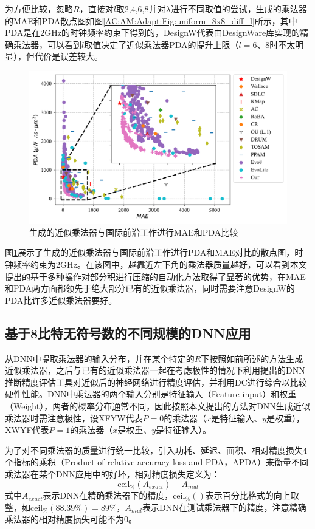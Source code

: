 为方便比较，忽略$R$，直接对$l$取2,4,6,8并对$\lambda$进行不同取值的尝试，生成的乘法器的MAE和PDA散点图如图\ref{AC:AM:Adapt:Fig:uniform_8x8_diff_l}所示，其中PDA是在2GHz的时钟频率约束下得到的，DesignW代表由DesignWare库\cite{IP:DesignWare}实现的精确乘法器，可以看到$l$取值决定了近似乘法器PDA的提升上限（$l=6$、8时不太明显），但代价是误差较大。

\begin{figure}[!h]
    \centering
    \includegraphics[width=\linewidth]{figs/AC-AM-Adapt-uniform_8x8_PDA_MAE.pdf}
    \caption{生成的近似乘法器与国际前沿工作进行MAE和PDA比较}
    \label{AC:AM:Adapt:Fig:uniform_8x8_PDA_MAE}
\end{figure}
图\ref{AC:AM:Adapt:Fig:uniform_8x8_PDA_MAE}展示了生成的近似乘法器与国际前沿工作进行PDA和MAE对比的散点图，时钟频率约束为2GHz。在该图中，越靠近左下角的乘法器质量越好，可以看到本文提出的基于多种操作对部分积进行压缩的自动化方法取得了显著的优势，在MAE和PDA两方面都领先于绝大部分已有的近似乘法器，同时需要注意DesignW的PDA比许多近似乘法器要好。


\subsection{基于8比特无符号数的不同规模的DNN应用}

从DNN中提取乘法器的输入分布，并在某个特定的$R$下按照如前所述的方法生成近似乘法器，之后与已有的近似乘法器一起在考虑极性的情况下利用提出的DNN推断精度评估工具对近似后的神经网络进行精度评估，并利用DC进行综合以比较硬件性能。DNN中乘法器的两个输入分别是特征输入（Feature input）和权重（Weight），两者的概率分布通常不同，因此按照本文提出的方法对DNN生成近似乘法器时需注意极性，设XFYW代表$P=0$的乘法器（$x$是特征输入、$y$是权重），XWYF代表$P=1$的乘法器（$x$是权重、$y$是特征输入）。

为了对不同乘法器的质量进行统一比较，引入功耗、延迟、面积、相对精度损失4个指标的乘积（Product of relative accuracy loss and PDA，APDA）来衡量不同乘法器在某个DNN应用中的好坏，相对精度损失定义为：
\begin{equation}
     \text{ceil}_\% ( A_{exact} ) - A_{mul}
\label{AC:AM:Adapt:LeNet:Eq:accuracy_loss}
\end{equation}
式中$A_{exact}$表示DNN在精确乘法器下的精度，$\text{ceil}_\%()$表示百分比格式的向上取整，如$\text{ceil}_\%(88.39\%) = 89\% $，$A_{mul}$表示DNN在测试乘法器下的精度，注意精确乘法器的相对精度损失可能不为0。

